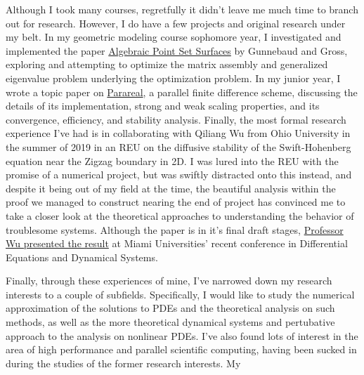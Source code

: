 \documentclass{article}
\begin{document}
Although I took many courses, regretfully it didn't leave me much time to branch
out for research. However, I do have a few projects and original research under
my belt. In my geometric modeling course sophomore year, I investigated and
implemented the paper
\href{https://abhijit-c.github.io/storage/Guennebaud07.pdf}
{Algebraic Point Set Surfaces} 
by Gunnebaud and Gross, exploring and attempting to optimize the matrix assembly
and generalized eigenvalue problem underlying the optimization problem. In my
junior year, I wrote a topic paper on
\href{https://abhijit-c.github.io/Research/resources/Parareal/Parareal.pdf}
{Parareal},
a parallel finite difference scheme, discussing the details of its
implementation, strong and weak scaling properties, and its convergence,
efficiency, and stability analysis. Finally, the most formal research experience
I've had is in collaborating with Qiliang Wu from Ohio University in the summer
of 2019 in an REU on the diffusive stability of the Swift-Hohenberg equation
near the Zigzag boundary in 2D. I was lured into the REU with the promise of
a numerical project, but was swiftly distracted onto this instead, and despite
it being out of my field at the time, the beautiful analysis within the proof we
managed to construct nearing the end of project has convinced me to take
a closer look at the theoretical approaches to understanding the behavior of
troublesome systems. Although the paper is in it's final draft stages, 
\href{https://abhijit-c.github.io/Research/resources/SHE/slides.pdf}
{Professor Wu presented the result} 
at Miami Universities' recent conference in Differential Equations and Dynamical
Systems.

Finally, through these experiences of mine, I've narrowed down my research
interests to a couple of subfields. Specifically, I would like to study 
the numerical approximation of the solutions to PDEs and the theoretical
analysis on such methods, as well as the more theoretical dynamical systems and
pertubative approach to the analysis on nonlinear PDEs. I've also found lots of
interest in the area of high performance and parallel scientific computing,
having been sucked in during the studies of the former research interests. My
\end{document}
